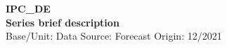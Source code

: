 \documentclass[a4paper,10pt]{article}
\begin{document}
\thispagestyle{empty}
\begin{landscape}
\begin{center}

\textbf{IPC_DE} \\ 

\textbf{Series brief description} \\ 

Base/Unit: 
\space \space \space Data Source:  
\space \space \space Forecast Origin: 12/2021 \\ 
\end{center}

\begin{footnotesize} \singlespacing  \end{footnotesize} 

\end{landscape}
\end{document}
